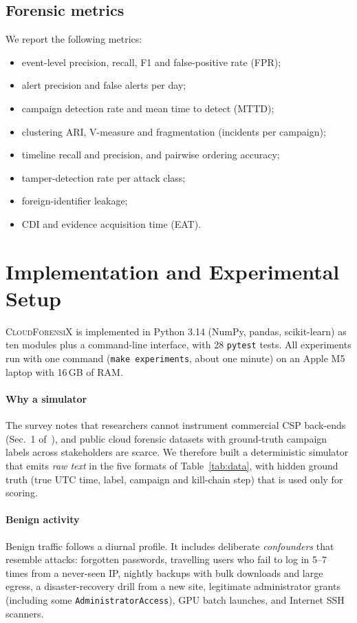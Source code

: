 \documentclass[conference,10pt]{IEEEtran}
\newcommand{\ours}{\textsc{CloudForensiX}}
\begin{document}
\subsection{Forensic metrics}
We report the following metrics:
\begin{itemize}
\item event-level precision, recall, F1 and false-positive rate (FPR);
\item alert precision and false alerts per day;
\item campaign detection rate and mean time to detect (MTTD);
\item clustering ARI, V-measure and fragmentation (incidents per campaign);
\item timeline recall and precision, and pairwise ordering accuracy;
\item tamper-detection rate per attack class;
\item foreign-identifier leakage;
\item CDI and evidence acquisition time (EAT).
\end{itemize}

\section{Implementation and Experimental Setup}
\label{sec:setup}
\ours{} is implemented in Python 3.14 (NumPy, pandas, scikit-learn) as ten modules plus a command-line interface, with 28 \texttt{pytest} tests. All experiments run with one command (\texttt{make experiments}, about one minute) on an Apple M5 laptop with 16\,GB of RAM.

\paragraph*{Why a simulator} The survey notes that researchers cannot instrument commercial CSP back-ends (Sec.~1 of~\cite{manral2019}), and public cloud forensic datasets with ground-truth campaign labels across stakeholders are scarce. We therefore built a deterministic simulator that emits \emph{raw text} in the five formats of Table~\ref{tab:data}, with hidden ground truth (true UTC time, label, campaign and kill-chain step) that is used only for scoring.

\paragraph*{Benign activity} Benign traffic follows a diurnal profile. It includes deliberate \emph{confounders} that resemble attacks: forgotten passwords, travelling users who fail to log in 5--7 times from a never-seen IP, nightly backups with bulk downloads and large egress, a disaster-recovery drill from a new site, legitimate administrator grants (including some \texttt{AdministratorAccess}), GPU batch launches, and Internet SSH scanners.
\end{document}
